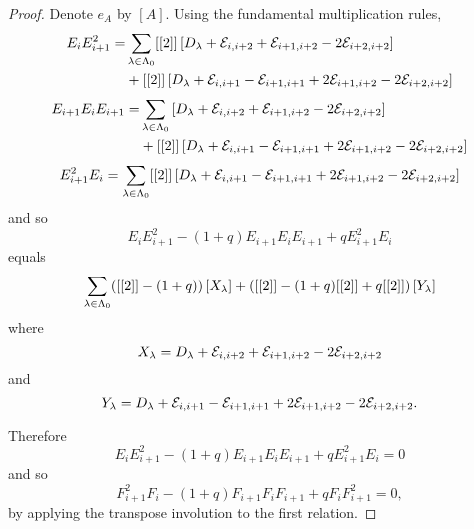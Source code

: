 \documentclass[a4paper, 11pt, twoside]{report}
\begin{document}
\begin{proof}
Denote $e_A$ by $\left[A\right]$. Using the fundamental multiplication rules,
\begin{align*}
E_i E_{i+1}^2 = &\sum_{\lambda\in\Lambda_0{}} [[2]]\left[D_{\lambda} +\mathcal{E}_{i,i+2} +\mathcal{E}_{i+1,i+2} -2\mathcal{E}_{i+2,i+2}\right]\\
&+[[2]]\left[D_{\lambda} +\mathcal{E}_{i,i+1} -\mathcal{E}_{i+1,i+1} +2\mathcal{E}_{i+1,i+2} - 2\mathcal{E}_{i+2,i+2}\right]
\end{align*}
\begin{align*}
E_{i+1}E_i E_{i+1} = &\sum_{\lambda\in\Lambda_0{}} \left[D_{\lambda} +\mathcal{E}_{i,i+2} +\mathcal{E}_{i+1,i+2} - 2\mathcal{E}_{i+2,i+2}\right]\\
&+[[2]]\left[D_{\lambda} +\mathcal{E}_{i,i+1} -\mathcal{E}_{i+1,i+1} +2\mathcal{E}_{i+1,i+2} -2\mathcal{E}_{i+2,i+2}\right]
\end{align*}
\begin{equation*}
E_{i+1}^2 E_i = \sum_{\lambda\in\Lambda_0{}} [[2]]\left[D_{\lambda} +\mathcal{E}_{i,i+1} -\mathcal{E}_{i+1,i+1} +2\mathcal{E}_{i+1,i+2} -2\mathcal{E}_{i+2,i+2}\right]
\end{equation*}
and so
\begin{equation*}
E_i E_{i+1}^2 - (1+q)E_{i+1} E_i E_{i+1} + qE_{i+1}^2 E_i
\end{equation*}
equals
\begin{equation*}
\sum_{\lambda\in\Lambda_0{}} ([[2]] -(1+q))\left[X_\lambda\right] + ([[2]] -(1+q)[[2]] +q[[2]])\left[Y_\lambda\right]
\end{equation*}
where
\begin{equation*}
X_\lambda=D_{\lambda} +\mathcal{E}_{i,i+2} +\mathcal{E}_{i+1,i+2} -2\mathcal{E}_{i+2,i+2}
\end{equation*}
and
\begin{equation*}
Y_\lambda=D_{\lambda} +\mathcal{E}_{i,i+1} -\mathcal{E}_{i+1,i+1} +2\mathcal{E}_{i+1,i+2} -2\mathcal{E}_{i+2,i+2}.
\end{equation*}

Therefore
\begin{equation*}
E_i E_{i+1}^2 -(1+q)E_{i+1} E_i E_{i+1} +qE_{i+1}^2 E_i = 0
\end{equation*}
and so
\begin{equation*}
F_{i+1}^2F_i -(1+q)F_{i+1}F_iF_{i+1} +qF_iF_{i+1}^2 = 0,
\end{equation*}
by applying the transpose involution to the first relation.


\end{proof}
\end{document}
